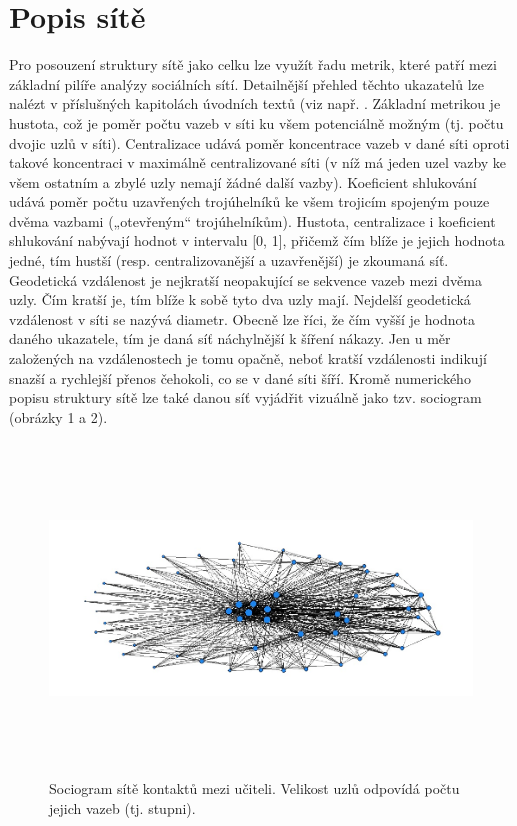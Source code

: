 \section*{Popis sítě} 

Pro posouzení struktury sítě jako celku lze využít řadu metrik, které patří mezi základní pilíře analýzy sociálních sítí. Detailnější přehled těchto ukazatelů lze nalézt v příslušných kapitolách úvodních textů (viz např. \cite{borgatti2018analyzing, prell2012social}. Základní metrikou je hustota, což je poměr počtu vazeb v síti ku všem potenciálně možným (tj. počtu dvojic uzlů v síti). Centralizace udává poměr koncentrace vazeb v dané síti oproti takové koncentraci v maximálně centralizované síti (v níž má jeden uzel vazby ke všem ostatním a zbylé uzly nemají žádné další vazby). Koeficient shlukování udává poměr počtu uzavřených trojúhelníků ke všem trojicím spojeným pouze dvěma vazbami („otevřeným“ trojúhelníkům). Hustota, centralizace i koeficient shlukování nabývají hodnot v intervalu [0, 1], přičemž čím blíže je jejich hodnota jedné, tím hustší (resp. centralizovanější a uzavřenější) je zkoumaná síť. Geodetická vzdálenost je nejkratší neopakující se sekvence vazeb mezi dvěma uzly. Čím kratší je, tím blíže k sobě tyto dva uzly mají. Nejdelší geodetická vzdálenost v síti se nazývá diametr. Obecně lze říci, že čím vyšší je hodnota daného ukazatele, tím je daná síť náchylnější k šíření nákazy. Jen u měr založených na vzdálenostech je tomu opačně, neboť kratší vzdálenosti indikují snazší a rychlejší přenos čehokoli, co se v dané síti šíří. Kromě numerického popisu struktury sítě lze také danou síť vyjádřit vizuálně jako tzv. sociogram (obrázky 1 a 2).

\begin{figure}[ht]
    \centering
    \includegraphics[width=320pt, height=250pt]{./pic/teachers_all_degree.jpg}
    \caption{Sociogram sítě kontaktů mezi učiteli. Velikost uzlů odpovídá počtu jejich vazeb (tj. stupni).}
    \label{fig:100-students}
\end{figure}

